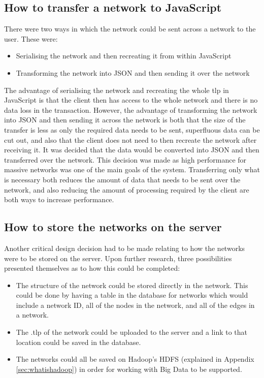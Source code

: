 \documentclass[../dissertation.tex]{subfiles}
\begin{document}
\subsection{How to transfer a network to JavaScript}

There were two ways in which the network could be sent across a network to the user. These were:

\begin{itemize}
    \item Serialising the network and then recreating it from within JavaScript
    \item Transforming the network into JSON and then sending it over the network
\end{itemize}

The advantage of serialising the network and recreating the whole tlp in JavaScript is that the client then has access to the whole network and there is no data loss in the transaction. However, the advantage of transforming the network into JSON and then sending it across the network is both that the size of the transfer is less as only the required data needs to be sent, superfluous data can be cut out, and also that the client does not need to then recreate the network after receiving it. It was decided that the data would be converted into JSON and then transferred over the network. This decision was made as high performance for massive networks was one of the main goals of the system. Transferring only what is necessary both reduces the amount of data that needs to be sent over the network, and also reducing the amount of processing required by the client are both ways to increase performance.

\subsection{How to store the networks on the server}

Another critical design decision had to be made relating to how the networks were to be stored on the server. Upon further research, three possibilities presented themselves as to how this could be completed:

\begin{itemize}
    \item The structure of the network could be stored directly in the network. This could be done by having a table in the database for networks which would include a network ID, all of the nodes in the network, and all of the edges in a network.
    \item The .tlp of the network could be uploaded to the server and a link to that location could be saved in the database.
    \item The networks could all be saved on Hadoop's HDFS (explained in Appendix \ref{sec:whatishadoop}) in order for working with Big Data to be supported.
\end{itemize}
\end{document}
